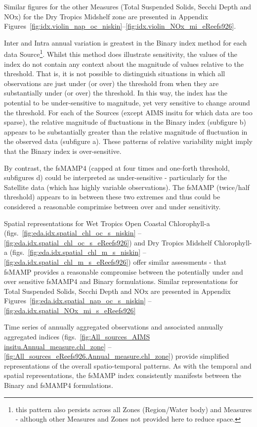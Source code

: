 Similar figures for the other Measures (Total Suspended Solids, Secchi Depth and NOx) for the
Dry Tropics Midshelf zone are presented in Appendix Figures~\ref{fig:idx.violin_nap_oc_niskin}--\ref{fig:idx.violin_NOx_mi_eReefs926}.

Inter and Intra annual variation is greatest in the Binary index method for each data
Source\footnote{this pattern also persists across all Zones (Region/Water body) and Measures -
although other Measures and Zones not provided here to reduce space.}.  Whilst this method does
illustrate sensitivity, the values of the index do not contain any context about the magnitude of
values relative to the threshold.  That is, it is not possible to distinguish situations in which
all observations are just under (or over) the threshold from when they are substantially under (or
over) the threshold. In this way, the index has the potential to be under-sensitive to magnitude,
yet very sensitive to change around the threshold.  For each of the Sources (except AIMS insitu for
which data are too sparse), the relative magnitude of fluctuations in the Binary index (subfigure b)
appears to be substantially greater than the relative magnitude of fluctuation in the observed data
(subfigure a).  These patterns of relative variability might imply that the Binary index is
over-sensitive.

By contrast, the fsMAMP4 (capped at four times and one-forth threshold, subfigures d) could be
interpreted as under-sensitive - particularly for the Satellite data (which has highly variable
observations).  The fsMAMP (twice/half threshold) appears to in between these two extremes and thus
could be considered a reasonable comprimise between over and under sensitivity.

Spatial representations for Wet Tropics Open Coastal Chlorophyll-a
(figs.~\ref{fig:eda.idx.spatial_chl_oc_s_niskin} -- \ref{fig:eda.idx.spatial_chl_oc_s_eReefs926})
and Dry Tropics Midshelf Chlorophyll-a (figs.~\ref{fig:eda.idx.spatial_chl_m_s_niskin} --
\ref{fig:eda.idx.spatial_chl_m_s_eReefs926}) offer similar assessments - that fsMAMP provides a
reasonable compromise between the potentially under and over sensitive fsMAMP4 and Binary
formulations.  Similar representations for Total Suspended Solids, Secchi Depth and NOx are
presented in Appendix Figures~\ref{fig:eda.idx.spatial_nap_oc_s_niskin} -- \ref{fig:eda.idx.spatial_NOx_mi_s_eReefs926}

Time series of annually aggregated observations and associated annually aggregated indices
(figs.~\ref{fig:All_sources_AIMS insitu.Annual_measure.chl_zone} --
\ref{fig:All_sources_eReefs926.Annual_measure.chl_zone}) provide simplified representations of the
overall spatio-temporal patterns.  As with the temporal and spatial representations, the fsMAMP
index consistently manifests between the Binary and fsMAMP4 formulations.

